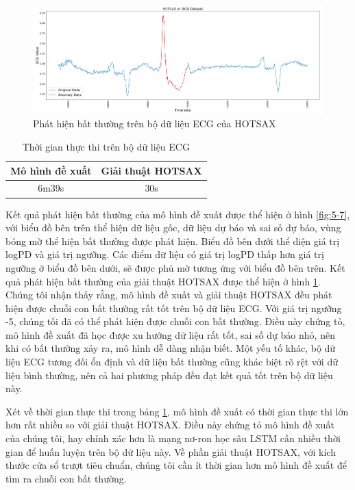 \begin{figure}[H]
    \centering
    \includegraphics[scale=0.85]{./content/images/5-8.png}
    \caption{Phát hiện bất thường trên bộ dữ liệu ECG của HOTSAX}
    \label{fig:5-8}
\end{figure}

\begin{table}[H]
\centering
\begin{tabular}{|c|c|}
\hline
\textbf{Mô hình đề xuất} & \textbf{Giải thuật HOTSAX}  \\
\hline
6m39s                       & 30s                     \\
\hline
\end{tabular}
\caption{Thời gian thực thi trên bộ dữ liệu ECG}
\label{tab:5-4}
\end{table}

Kết quả phát hiện bất thường của mô hình đề xuất được thể hiện ở hình \ref{fig:5-7}, với biểu đồ bên trên thể hiện dữ liệu gốc, dữ liệu dự báo và sai số dự báo, vùng bóng mờ thể hiện bất thường được phát hiện. Biểu đồ bên dưới thể diện giá trị logPD và giá trị ngưỡng. Các điểm dữ liệu có giá trị logPD thấp hơn giá trị ngưỡng ở biểu đồ bên dưới, sẽ được phủ mờ tương ứng với biểu đồ bên trên. Kết quả phát hiện bất thường của giải thuật HOTSAX được thể hiện ở hình \ref{fig:5-8}. Chúng tôi nhận thấy rằng, mô hình đề xuất và giải thuật HOTSAX đều phát hiện được chuỗi con bất thường rất tốt trên bộ dữ liệu ECG. Với giá trị ngưỡng -5, chúng tối đã có thể phát hiện được chuỗi con bất thường. Điều này chứng tỏ, mô hình đề xuất đã học được xu hướng dữ liệu rất tốt, sai số dự báo nhỏ, nên khi có bất thường xảy ra, mô hình dễ dàng nhận biết. Một yếu tố khác, bộ dữ liệu ECG tương đối ổn định và dữ liệu bất thường cũng khác biệt rõ rệt với dữ liệu bình thường, nên cả hai phương pháp đều đạt kết quả tốt trên bộ dữ liệu này.

Xét về thời gian thực thi trong bảng \ref{tab:5-4}, mô hình đề xuất có thời gian thực thi lớn hơn rất nhiều so với giải thuật HOTSAX. Điều này chứng tỏ mô hình đề xuất của chúng tôi, hay chính xác hơn là mạng nơ-ron học sâu LSTM cần nhiều thời gian để huấn luyện trên bộ dữ liệu này. Về phần giải thuật HOTSAX, với kích thước cửa sổ trượt tiêu chuẩn, chúng tôi cần ít thời gian hơn mô hình đề xuất để tìm ra chuỗi con bất thường.


